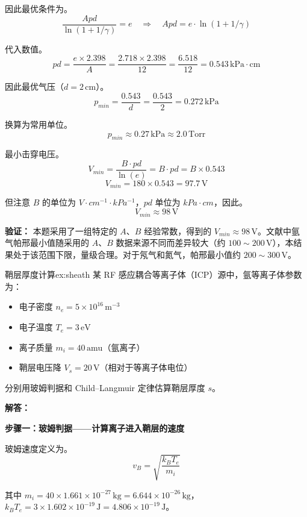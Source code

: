 因此最优条件为。
\[
    \frac{A p d}{\ln(1+1/\gamma)} = e \quad\Rightarrow\quad A p d = e \cdot \ln(1+1/\gamma)
\]

代入数值。
\[
    p d = \frac{e \times 2.398}{A} = \frac{2.718 \times 2.398}{12} = \frac{6.518}{12} = 0.543\,\mathrm{kPa\cdot cm}
\]

因此最优气压（$d=2\,\mathrm{cm}$）。
\[
    p_{min} = \frac{0.543}{d} = \frac{0.543}{2} = 0.272\,\mathrm{kPa}
\]

换算为常用单位。
\[
    \boxed{p_{min} \approx 0.27\,\mathrm{kPa} \approx 2.0\,\mathrm{Torr}}
\]

最小击穿电压。
\[
    V_{min} = \frac{B \cdot p d}{\ln(e)} = B \cdot p d = B \times 0.543
\]
\[
    V_{min} = 180 \times 0.543 = 97.7\,\mathrm{V}
\]

但注意 $B$ 的单位为 $V\cdot cm^{-1}\cdot kPa^{-1}$，$p d$ 单位为 $kPa\cdot cm$，因此。
\[
    \boxed{V_{min} \approx 98\,\mathrm{V}}
\]

\textbf{验证：} 本题采用了一组特定的 $A$、$B$ 经验常数，得到的 $V_{min}\approx 98\,\mathrm{V}$。文献中氩气帕邢最小值随采用的 $A$、$B$ 数据来源不同而差异较大（约 $100\sim200\,\mathrm{V}$），本结果处于该范围下限，量级合理。对于氖气和氮气，帕邢最小值约 $200\sim300\,\mathrm{V}$。


\begin{example}{鞘层厚度计算}{ex:sheath}
某 RF 感应耦合等离子体（ICP）源中，氩等离子体参数为：
\begin{itemize}
    \item 电子密度 $n_e = 5\times10^{16}\,\mathrm{m^{-3}}$
    \item 电子温度 $T_e = 3\,\mathrm{eV}$
    \item 离子质量 $m_i = 40\,\mathrm{amu}$（氩离子）
    \item 鞘层电压降 $V_s = 20\,\mathrm{V}$（相对于等离子体电位）
\end{itemize}
分别用玻姆判据和 Child--Langmuir 定律估算鞘层厚度 $s$。
\end{example}

\textbf{解答：}

\textbf{步骤一：玻姆判据——计算离子进入鞘层的速度}

玻姆速度定义为。
\begin{equation}
    v_B = \sqrt{\frac{k_B T_e}{m_i}}
\label{eq:ch11-bohm-criterion-ex}
\end{equation}

其中 $m_i = 40 \times 1.661\times10^{-27}\,\mathrm{kg} = 6.644\times10^{-26}\,\mathrm{kg}$，$k_B T_e = 3 \times 1.602\times10^{-19}\,\mathrm{J} = 4.806\times10^{-19}\,\mathrm{J}$。

